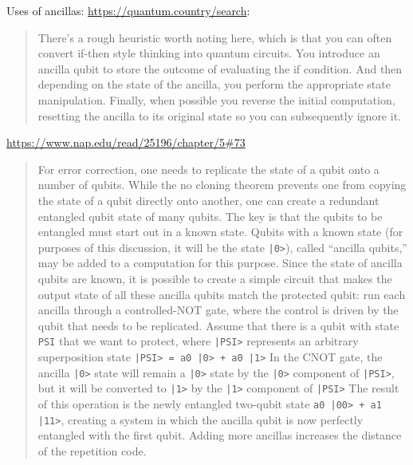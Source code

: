 \documentclass[sigplan,10pt,review,anonymous]{acmart}
\begin{document}
Uses of ancillas:
\url{https://quantum.country/search}:

\begin{quote}
  There’s a rough heuristic worth noting here, which is that you can
  often convert if-then style thinking into quantum circuits. You
  introduce an ancilla qubit to store the outcome of evaluating the if
  condition. And then depending on the state of the ancilla, you
  perform the appropriate state manipulation. Finally, when possible
  you reverse the initial computation, resetting the ancilla to its
  original state so you can subsequently ignore it.
\end{quote}

\url{https://www.nap.edu/read/25196/chapter/5#73}
\begin{quote}
  For error correction, one needs to replicate the state of a qubit
  onto a number of qubits. While the no cloning theorem prevents one
  from copying the state of a qubit directly onto another, one can
  create a redundant entangled qubit state of many qubits. The key is
  that the qubits to be entangled must start out in a known
  state. Qubits with a known state (for purposes of this discussion,
  it will be the state \verb.|0>.), called ``ancilla qubits,'' may be
  added to a computation for this purpose. Since the state of ancilla
  qubits are known, it is possible to create a simple circuit that
  makes the output state of all these ancilla qubits match the
  protected qubit: run each ancilla through a controlled-NOT gate,
  where the control is driven by the qubit that needs to be
  replicated. Assume that there is a qubit with state \verb.PSI. that
  we want to protect, where \verb.|PSI>. represents an arbitrary
  superposition state \verb.|PSI> = a0 |0> + a0 |1>. In the CNOT gate,
  the ancilla \verb.|0>. state will remain a \verb.|0>. state by the
  \verb.|0>. component of \verb.|PSI>., but it will be converted to
  \verb.|1>. by the \verb.|1>. component of \verb.|PSI>. The result of
  this operation is the newly entangled two-qubit state
  \verb.a0 |00> + a1 |11>., creating a system in which the ancilla
  qubit is now perfectly entangled with the first qubit. Adding more
  ancillas increases the distance of the repetition code.  \end{quote}
\end{document}
